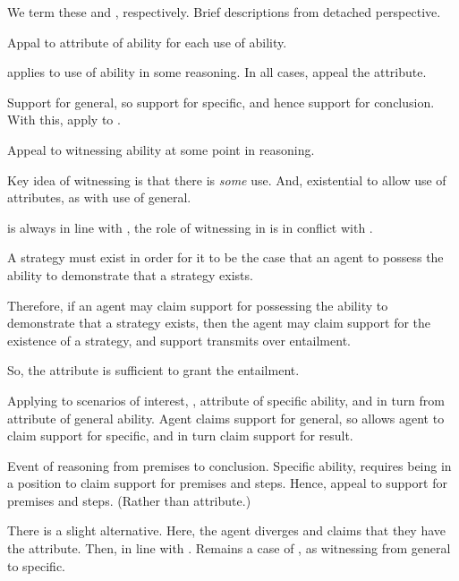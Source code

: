 \begin{note}[\WR{} and \AR{}]
  We term these \AR{} and \WR{}, respectively.
  Brief descriptions from detached perspective.

  \begin{proposition}[\AR{}]\label{A:s}
    Appal to attribute of ability for each use of ability.
  \end{proposition}

  \AR{} applies to use of ability in some reasoning.
  In all cases, appeal the attribute.

  Support for general, so support for specific, and hence support for conclusion.
  With this, apply to \aben{}.

  \begin{proposition}[\WR{}]
    Appeal to witnessing ability at some point in reasoning.
  \end{proposition}

  Key idea of witnessing is that there is \emph{some} use.
  And, existential to allow use of attributes, as with use of general.

  \AR{} is always in line with \uRa{}, the role of witnessing in \WR{} is in conflict with \uRa{}.
\end{note}

\begin{note}[\PA{} and \PW{}]
   \begin{proposition}[\PA{}]
    A strategy must exist in order for it to be the case that an agent to possess the ability to demonstrate that a strategy exists.

    Therefore, if an agent may claim support for possessing the ability to demonstrate that a strategy exists, then the agent may claim support for the existence of a strategy, and support transmits over entailment.

    So, the attribute is sufficient to grant the entailment.
  \end{proposition}

  Applying to scenarios of interest, \AR{}, attribute of specific ability, and in turn from attribute of general ability.
  Agent claims support for general, so allows agent to claim support for specific, and in turn claim support for result.

  \begin{proposition}[\PW{}]\label{W:s}
    Event of reasoning from premises to conclusion.
    Specific ability, requires being in a position to claim support for premises and steps.
    Hence, appeal to support for premises and steps.
    (Rather than attribute.)
  \end{proposition}

  There is a slight alternative.
  Here, the agent diverges and claims that they have the attribute.
  Then, in line with \PA{}.
  Remains a case of \WR{}, as witnessing from general to specific.
\end{note}

